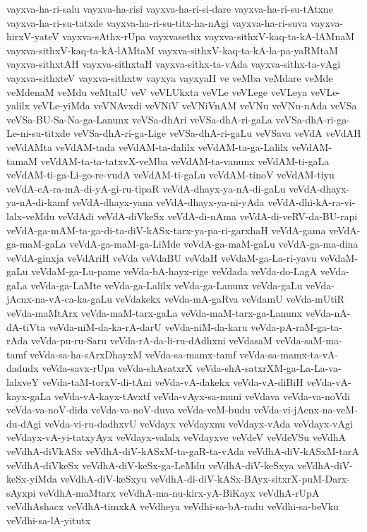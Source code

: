 {vayxva-ha-ri-salu
vayxva-ha-risi
vayxva-ha-ri-si-dare
vayxva-ha-ri-su-tAtxne
vayxva-ha-ri-su-tatxde
vayxva-ha-ri-su-titx-ha-nAgi
vayxva-ha-ri-suva
vayxva-hirxV-yateV
vayxva-sAthx-rUpa
vayxvasethx
vayxva-sithxV-kaq-ta-kA-lAMnaM
vayxva-sithxV-kaq-ta-kA-lAMtaM
vayxva-sithxV-kaq-ta-kA-la-pa-yaRMtaM
vayxva-sithxtAH
vayxva-sithxtaH
vayxva-sithx-ta-vAda
vayxva-sithx-ta-vAgi
vayxva-sithxteV
vayxva-sithxtw
vayxya
vayxyaH
ve
veMba
veMdare
veMde
veMdenaM
veMdu
veMtalU
veV
veVLUkxta
veVLe
veVLege
veVLeya
veVLe-yalilx
veVLe-yiMda
veVNAvxdi
veVNiV
veVNiVnAM
veVNu
veVNu-nAda
veVSa
veVSa-BU-Sa-Na-ga-Lanunx
veVSa-dhAri
veVSa-dhA-ri-gaLa
veVSa-dhA-ri-ga-Le-ni-su-titxde
veVSa-dhA-ri-ga-Lige
veVSa-dhA-ri-gaLu
veVSava
veVdA
veVdAH
veVdAMta
veVdAM-tada
veVdAM-ta-dalilx
veVdAM-ta-ga-Lalilx
veVdAM-tamaM
veVdAM-ta-ta-tatxvX-veMba
veVdAM-ta-vanunx
veVdAM-ti-gaLa
veVdAM-ti-ga-Li-go-re-vudA
veVdAM-ti-gaLu
veVdAM-tinoV
veVdAM-tiyu
veVdA-cA-ra-mA-di-yA-gi-ru-tipaR
veVdA-dhayx-ya-nA-di-gaLu
veVdA-dhayx-ya-nA-di-kamf
veVdA-dhayx-yana
veVdA-dhayx-ya-ni-yAda
veVdA-dhi-kA-ra-vi-lalx-veMdu
veVdAdi
veVdA-diVkeSx
veVdA-di-nAma
veVdA-di-veRV-da-BU-rapi
veVdA-ga-mAM-ta-ga-di-ta-diV-kASx-tarx-ya-pa-ri-garxhaH
veVdA-gama
veVdA-ga-maM-gaLa
veVdA-ga-maM-ga-LiMde
veVdA-ga-maM-gaLu
veVdA-ga-ma-dina
veVdA-ginxja
veVdAriH
veVda
veVdaBU
veVdaH
veVdaM-ga-La-ri-yavu
veVdaM-gaLu
veVdaM-ga-Lu-pame
veVda-bA-hayx-rige
veVdada
veVda-do-LagA
veVda-gaLa
veVda-ga-LaMte
veVda-ga-Lalilx
veVda-ga-Lanunx
veVda-gaLu
veVda-jAcnx-na-vA-ca-ka-gaLu
veVdakekx
veVda-mA-gaRva
veVdamU
veVda-mUtiR
veVda-maMtArx
veVda-maM-tarx-gaLa
veVda-maM-tarx-ga-Lanunx
veVda-nA-dA-tiVta
veVda-niM-da-ka-rA-darU
veVda-niM-da-karu
veVda-pA-raM-ga-ta-rAda
veVda-pu-ru-Saru
veVda-rA-da-li-ru-dAdhxni
veVdasaM
veVda-saM-ma-tamf
veVda-sa-ha-sArxDhayxM
veVda-sa-mamx-tamf
veVda-sa-mamx-ta-vA-dadudx
veVda-savx-rUpa
veVda-shAsatxrX
veVda-shA-satxrXM-ga-La-La-va-lalxveY
veVda-taM-torxV-di-tAni
veVda-vA-dakekx
veVda-vA-diBiH
veVda-vA-kayx-gaLa
veVda-vA-kayx-tAvxtf
veVda-vAyx-sa-muni
veVdava
veVda-va-noVdi
veVda-va-noV-dida
veVda-va-noV-duva
veVda-veM-budu
veVda-vi-jAcnx-na-veM-du-dAgi
veVda-vi-ru-dadhxvU
veVdayx
veVdayxnu
veVdayx-vAda
veVdayx-vAgi
veVdayx-vA-yi-tatxyAyx
veVdayx-valalx
veVdayxve
veVdeV
veVdeVSu
veVdhA
veVdhA-diVkASx
veVdhA-diV-kASxM-ta-gaR-ta-vAda
veVdhA-diV-kASxM-tarA
veVdhA-diVkeSx
veVdhA-diV-keSx-ga-LeMdu
veVdhA-diV-keSxya
veVdhA-diV-keSx-yiMda
veVdhA-diV-keSxyu
veVdhA-di-diV-kASx-BAyx-sitxrX-puM-Darx-sAyxpi
veVdhA-maMtarx
veVdhA-ma-nu-kirx-yA-BiKayx
veVdhA-rUpA
veVdhAshacx
veVdhA-timxkA
veVdheya
veVdhi-sa-bA-radu
veVdhi-sa-beVku
veVdhi-sa-lA-yitutx
}
